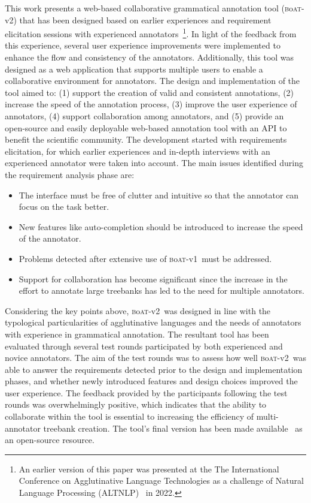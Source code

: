 \documentclass{elektr}
\newcommand{\boatvone}{\textsc{b}o\textsc{at}-{\scriptsize v1}}
\newcommand{\boatvtwo}{\textsc{b}o\textsc{at}-{\scriptsize v2}}
\begin{document}
This work presents a web-based collaborative grammatical annotation tool (\boatvtwo) that has been designed based on earlier experiences and requirement elicitation sessions with experienced annotators~\footnote{An earlier version of this paper was presented at the The International Conference on Agglutinative Language Technologies as a challenge of Natural Language Processing (ALTNLP)~\cite{anon} in 2022.}.
In light of the feedback from this experience, several user experience improvements were implemented to enhance the flow and consistency of the annotators.
Additionally, this tool was designed as a web application that supports multiple users to enable a collaborative environment for annotators.
The design and implementation of the tool aimed to: (1) support the creation of valid and consistent annotations, (2) increase the speed of the annotation process, (3) improve the user experience of annotators, (4) support collaboration among annotators, and (5) provide an open-source and easily deployable web-based annotation tool with an API to benefit the scientific community.
The development started with requirements elicitation, for which earlier experiences and in-depth interviews with an experienced annotator were taken into account.
The main issues identified during the requirement analysis phase are:
\begin{itemize}
\setlength\itemsep{0em}
\item The interface must be free of clutter and intuitive so that the annotator can focus on the task better.
\item New features like auto-completion should be introduced to increase the speed of the annotator.
\item Problems detected after extensive use of \boatvone\ must be addressed.
\item Support for collaboration has become significant since the increase in the effort to annotate large treebanks has led to the need for multiple annotators.
\end{itemize}

Considering the key points above, \boatvtwo\ was designed in line with the typological particularities of agglutinative languages and the needs of annotators with experience in grammatical annotation.
The resultant tool has been evaluated through several test rounds participated by both experienced and novice annotators.
The aim of the test rounds was to assess how well \boatvtwo\ was able to answer the requirements detected prior to the design and implementation phases, and whether newly introduced features and design choices improved the user experience.
The feedback provided by the participants following the test rounds was overwhelmingly positive, which indicates that the ability to collaborate within the tool is essential to increasing the efficiency of multi-annotator treebank creation.
The tool's final version has been made available~\cite{anon} as an open-source resource.
\end{document}

